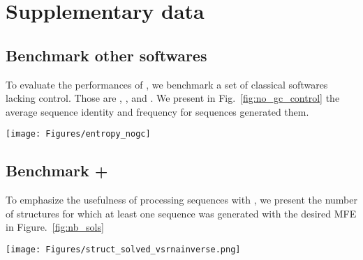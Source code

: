 \section{Supplementary data}

\subsection{Benchmark other softwares}
To evaluate the performances of \ourprog, we benchmark a set of classical softwares lacking \GCContent control. Those are \RNAinverse, \INFORNA, \NUPACK and \frankenstein. We present in Fig.~\ref{fig:no_gc_control} the average sequence identity and frequency
for sequences generated them.

\begin{figure*}[ht!]
  \centering
  \texttt{[image: Figures/entropy\_nogc]}
  \caption{The average sequence identity and frequency for softwares without \GCContent control.}
  \label{fig:no_gc_control}
\end{figure*}

\subsection{Benchmark \ourprog+\RNAinverse}
To emphasize the usefulness of processing \ourprog sequences with \RNAinverse, we present the number
of structures for which at least one sequence was generated with the desired MFE in Figure.~\ref{fig:nb_sols}

\begin{figure*}[ht!]
  \centering
  \texttt{[image: Figures/struct\_solved\_vsrnainverse.png]}
  \caption{The first row shows the number of structures for which one generated sequence has the 
  structure as MFE when only using \ourprog. The second row shows when we process \ourprog results with \RNAinverse.}
  \label{fig:nb_sols}
\end{figure*}



